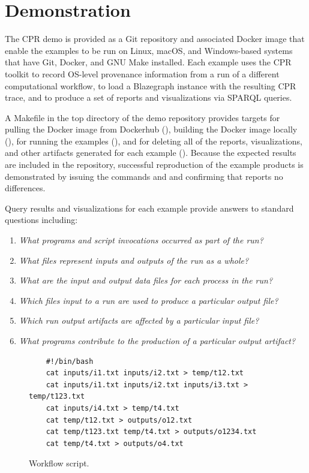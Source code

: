\section{Demonstration}

The CPR demo is provided as a Git repository and associated Docker image that enable the examples to be run on Linux, macOS, and Windows-based systems that have Git, Docker, and GNU Make installed. Each example uses the CPR toolkit to record OS-level provenance information from a run of a different computational workflow, to load a Blazegraph instance with the resulting CPR trace, and to produce a set of reports and visualizations via SPARQL queries.
 
A Makefile in the top directory of the demo repository provides targets for pulling the Docker image from Dockerhub (), building the Docker image locally (), for running the examples (), and for deleting all of the reports, visualizations, and other artifacts generated for each example (). Because the expected results are included in the repository, successful reproduction of the example products is demonstrated by issuing the commands  and  and confirming that  reports no differences.

Query results and visualizations for each example provide answers to standard questions including:
\begin{enumerate}
\item \emph{What programs and script invocations occurred as part of the run?}
\item \emph{What files represent inputs and outputs of the run as a whole?}
\item \emph{What are the input and output data files for each process in the run?}
\item \emph{Which files input to a run are used to produce a particular output file?}
\item \emph{Which run output artifacts are affected by a particular input file?}
\item \emph{What programs contribute to the production of a particular output artifact?}
\end{enumerate}

\begin{figure}[t]
\begin{verbatim}
    #!/bin/bash
    cat inputs/i1.txt inputs/i2.txt > temp/t12.txt
    cat inputs/i1.txt inputs/i2.txt inputs/i3.txt > temp/t123.txt
    cat inputs/i4.txt > temp/t4.txt
    cat temp/t12.txt > outputs/o12.txt
    cat temp/t123.txt temp/t4.txt > outputs/o1234.txt
    cat temp/t4.txt > outputs/o4.txt
\end{verbatim}
\vspace*{-1.5em}  %
        \caption{Workflow script.}
        \label{fig-script}
      \end{figure}


